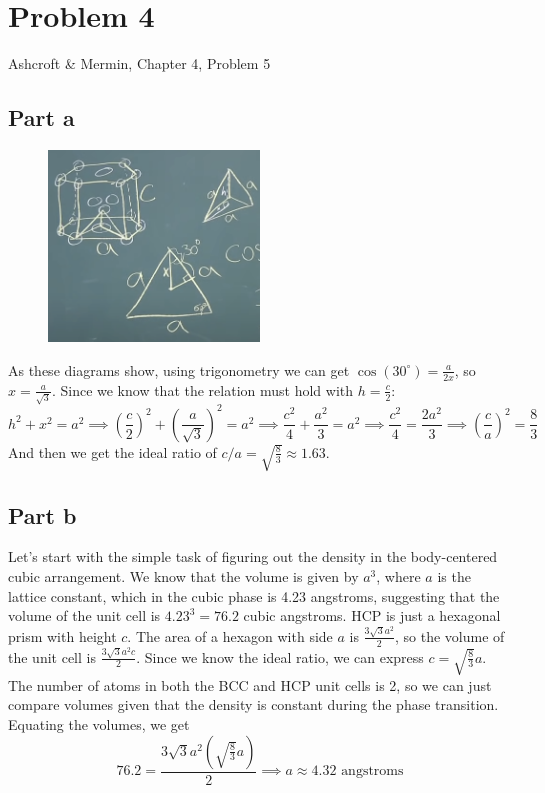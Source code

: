 \documentclass[12pt]{article}
\begin{document}
\section{Problem 4}
Ashcroft \& Mermin, Chapter 4, Problem 5
\subsection{Part a}
\begin{figure}[h]
    \centering
    \includegraphics[width=0.5\textwidth]{hcp.png}
\end{figure}
As these diagrams show, using trigonometry we can get $\cos(30^\circ) = \frac{a}{2x}$, so $x = \frac{a}{\sqrt{3}}$. Since we know that the relation must hold with $h=\frac{c}{2}$:
\begin{equation}
    h^2+x^2 = a^2 \implies \left(\frac{c}{2}\right)^2 + \left(\frac{a}{\sqrt{3}}\right)^2 = a^2 \implies \frac{c^2}{4} + \frac{a^2}{3} = a^2 \implies \frac{c^2}{4} = \frac{2a^2}{3} \implies \left(\frac{c}{a}\right)^2 = \frac{8}{3} 
\end{equation}
And then we get the ideal ratio of $c/a = \sqrt{\frac{8}{3}} \approx 1.63$.
\subsection{Part b}
Let's start with the simple task of figuring out the density in the body-centered cubic arrangement. We know that the volume is given by $a^3$, where $a$ is the lattice constant, which in the cubic phase is 4.23 angstroms, suggesting that the volume of the unit cell is $4.23^3 = 76.2$ cubic angstroms. HCP is just a hexagonal prism with height $c$. The area of a hexagon with side $a$ is $\frac{3\sqrt{3}a^2}{2}$, so the volume of the unit cell is $\frac{3\sqrt{3}a^2c}{2}$. Since we know the ideal ratio, we can express $c=\sqrt{\frac{8}{3}}a$. The number of atoms in both the BCC and HCP unit cells is 2, so we can just compare volumes given that the density is constant during the phase transition. Equating the volumes, we get
\begin{equation}
    76.2 = \frac{3\sqrt{3}a^2\left(\sqrt{\frac{8}{3}}a\right)}{2} \implies a \approx 4.32 \text{ angstroms}
\end{equation}
\end{document}
